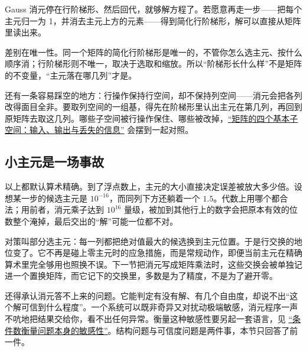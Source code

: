 Gauss 消元停在行阶梯形、然后回代，就够解方程了。若愿意再走一步——把每个主元归一为 1，并消去主元上方的元素——得到简化行阶梯形，解可以直接从矩阵里读出来。

差别在唯一性。同一个矩阵的简化行阶梯形是唯一的，不管你怎么选主元、按什么顺序消；行阶梯形则不唯一，取决于选取和缩放。所以``阶梯形长什么样''不是矩阵的不变量，``主元落在哪几列''才是。

还有一条容易踩空的地方：行操作保持行空间，却不保持列空间——消元会把各列改得面目全非。要取列空间的一组基，得先在阶梯形里认出主元在第几列，再回到原矩阵去取这几列。哪些子空间被行操作保住、哪些被改掉，\hyperref[sec:03-Linear-Algebra/02-Vector-Spaces/03]{``矩阵的四个基本子空间：输入、输出与丢失的信息''} 会摆到一起对照。

\subsection{小主元是一场事故}

以上都默认算术精确。到了浮点数上，主元的大小直接决定误差被放大多少倍。设想某一步的候选主元是 \(10^{-16}\)，而同列下方还躺着一个 \(1.5\)。代数上用哪个都合法；用前者，消元乘子达到 \(10^{16}\) 量级，被加到其他行上的数字会把原本有效的位数整个淹掉，最后交出的``解''可能一位都不对。

对策叫部分选主元：每一列都把绝对值最大的候选换到主元位置。于是行交换的地位变了。它不再是碰上零主元时的应急措施，而是常规动作，即便当前主元在精确算术里完全够用也照换不误。下一节把消元写成矩阵乘法时，这些交换会被单独记进一个置换矩阵，而它记下的交换里，多数是为了精度，不是为了避开零。

还得承认消元答不上来的问题。它能判定有没有解、有几个自由度，却说不出``这个解可信到什么程度''。一个系统可以既非奇异又对扰动极端敏感，消元程序一声不吭地把结果交给你，看不出任何异常。衡量这种敏感性要另起一套语言，见 \hyperref[sec:08-Numerical-Analysis/01-Floating-Point-and-Error/03]{``条件数衡量问题本身的敏感性''}。结构问题与可信度问题是两件事，本节只回答了前一件。
